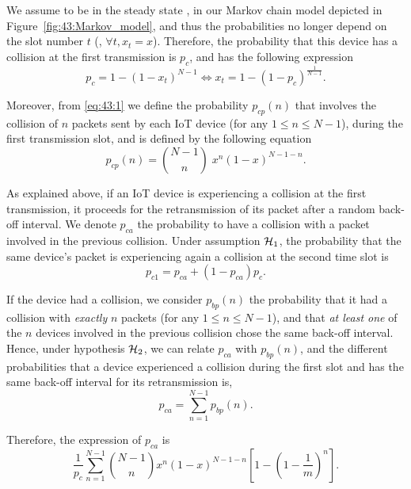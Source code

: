 We assume to be in the steady state \cite{Norris98}, in our Markov chain model depicted in Figure~\ref{fig:43:Markov_model}, and thus the probabilities no longer depend on the slot number $t$ (\ie, $\forall t, x_t=x$).
Therefore, the probability that this device has a collision at the first transmission is $p_c$, and has the following expression
\begin{equation}\label{eq:43:1}
	p_c = 1-\left(1-x_t\right)^{N-1} \iff x_t = 1-\left(1-p_c\right)^{\frac{1}{N-1}}.
\end{equation}

Moreover, from \eqref{eq:43:1} we define the probability $p_{cp}(n)$ that involves the collision of $n$ packets sent by each IoT device (for any $1\leq n \leq N-1$), during the first transmission slot, and is defined by the following equation
\begin{equation*}\label{eq:43:2}
	p_{cp}(n) = {N-1 \choose n} \; x^n \left(1-x\right)^{N-1-n}.
\end{equation*}

As explained above, if an IoT device is experiencing a collision at the first transmission, it proceeds for the retransmission of its packet after a random back-off interval.
We denote $p_{ca}$ the probability to have a collision with a packet involved in the previous collision.
Under assumption $\mathcal{H}_{1}$, the probability that the same device's packet is experiencing again a collision at the second time slot is
\begin{equation}\label{eq:43:decomppc1}
	p_{c1} = p_{ca}+\left(1-p_{ca} \right)p_c.
\end{equation}

If the device had a collision, we consider $p_{bp}(n)$ the probability that it had a collision with \emph{exactly} $n$ packets (for any $1\leq n \leq N-1$), and that \emph{at least one} of the $n$ devices involved in the previous collision chose the same back-off interval.
Hence, under hypothesis $\mathcal{H}_{2}$, we can relate $p_{ca}$ with $p_{bp}(n)$, and the different probabilities that a device experienced a collision during the first slot and has the same back-off interval for its retransmission is,
%
\begin{equation}\label{eq:43:sumpca}
	p_{ca} = \sum_{n=1}^{N-1} p_{bp}(n).
\end{equation}

Therefore, the expression of $p_{ca}$ is
\begin{equation}\label{eq:43:sumpc2}
	\frac{1}{p_c} \sum_{n=1}^{N-1}{N-1 \choose n} x^n \left(1-x\right)^{N-1-n}\left[1-\left( 1-\frac{1}{m}\right)^n \right].
\end{equation}

